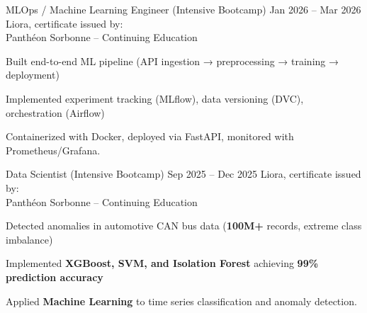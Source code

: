   \cvexperince
    {MLOps / Machine Learning Engineer (Intensive Bootcamp)}
    {Jan 2026 -- Mar 2026}
    {Liora, certificate issued by:\\Panthéon Sorbonne – Continuing Education}
    {
      \item Built end-to-end ML pipeline (API ingestion → preprocessing → training → deployment)
      \item Implemented experiment tracking (MLflow), data versioning (DVC), orchestration (Airflow)
      \item Containerized with Docker, deployed via FastAPI, monitored with Prometheus/Grafana.
      \item%
    }

\cvexperince
  {Data Scientist (Intensive Bootcamp)}
  {Sep 2025 -- Dec 2025}
  {Liora, certificate issued by:\\Panthéon Sorbonne – Continuing Education}
  {
    \item Detected anomalies in automotive CAN bus data (\textbf{100M+} records, extreme class imbalance)
    \item Implemented \textbf{XGBoost, SVM, and Isolation Forest} achieving \textbf{99\% prediction accuracy}
    \item Applied \textbf{Machine Learning} to time series classification and anomaly detection.
    \item%
  }
